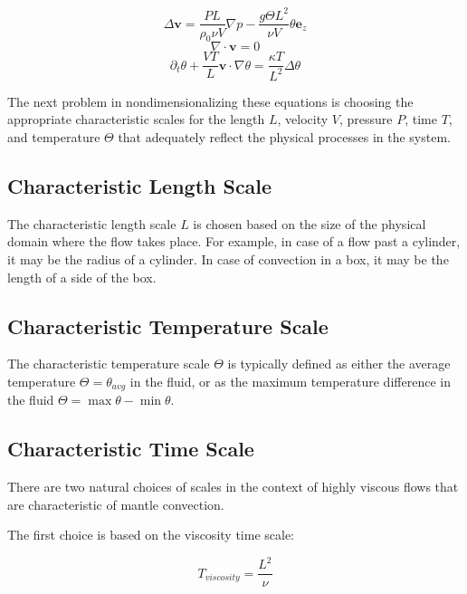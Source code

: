 \documentclass[
10pt, %
a4paper, %
oneside, %
headinclude,footinclude, %
BCOR5mm, %
]{scrartcl}
\providecommand{\divergence}{\nabla\cdot}
\providecommand{\velocity}{\mathbf{v}}
\providecommand{\surfaceNormal}{\mathbf{e}_z}
\providecommand{\pressGrad}{\nabla p}
\providecommand{\laplacianVel}{\Delta\velocity}
\providecommand{\partialTimeTemp}{\partial_t\theta}
\providecommand{\inertTermTemp}{\velocity\cdot\nabla\theta}
\providecommand{\laplacianTemp}{\Delta\theta}
\begin{document}
\begin{equation} \label{stokes1_pre_nondim}
\laplacianVel = \frac{P L}{\rho_0 \nu V}\pressGrad - \frac{g \Theta L^2}{\nu V} \theta \surfaceNormal
\end{equation}
\begin{equation} \label{stokes2_pre_nondim}
\divergence \velocity = 0
\end{equation}
\begin{equation} \label{heat_eq_pre_nondim}
\partialTimeTemp + \frac{VT}{L} \inertTermTemp = \frac{\kappa T}{L^2} \laplacianTemp  
\end{equation} 

The next problem in nondimensionalizing these equations is choosing the appropriate characteristic scales for the length $L$, velocity $V$, pressure $P$, time $T$, and temperature $\Theta$ that adequately reflect the physical processes in the system. 

\subsection{Characteristic Length Scale}

The characteristic length scale $L$ is chosen based on the size of the physical domain where the flow takes place. For example, in case of a flow past a cylinder, it may be the radius of a cylinder. In case of convection in a box, it may be the length of a side of the box.

\subsection{Characteristic Temperature Scale}

The characteristic temperature scale $\Theta$ is typically defined as either the average temperature $\Theta = \theta_{avg}$ in the fluid, or as the maximum temperature difference in the fluid $\Theta = \max \theta - \min \theta$.

\subsection{Characteristic Time Scale}

There are two natural choices of scales in the context of highly viscous flows that are characteristic of mantle convection. \cite[pp. 19-20]{getling}

The first choice is based on the viscosity time scale:

$$ T_{viscosity} = \frac{L^2}{\nu} $$
\end{document}
